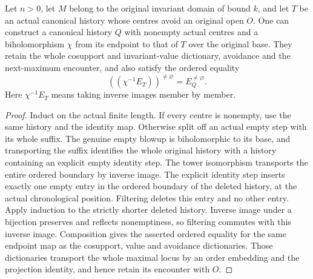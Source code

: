 \begin{theorem}
\label{hir:original-empty-compression-filtered-boundary}
\leanok
Let $n>0$, let $M$ belong to the original invariant domain of bound $k$,
and let $T$ be an actual canonical history whose centres avoid an
original open $O$.  One can construct a canonical history $Q$ with
nonempty actual centres and a biholomorphism $\chi$ from its endpoint to
that of $T$ over the original base.  They retain the whole cosupport and
invariant-value dictionary, avoidance and the next-maximum encounter,
and also satisfy the ordered equality
\[
 ((\chi^{-1}E_T))^{\ne\varnothing}=E_Q^{\ne\varnothing}.
\]
Here $\chi^{-1}E_T$ means taking inverse images member by member.
\end{theorem}
\begin{proof}
Induct on the actual finite length.  If every centre is nonempty, use
the same history and the identity map.  Otherwise split off an actual
empty step with its whole suffix.  The genuine empty blowup is
biholomorphic to its base, and transporting the suffix identifies the
whole original history with a history containing an explicit empty
identity step.  The tower isomorphism transports the entire ordered
boundary by inverse image.  The explicit identity step inserts exactly
one empty entry in the ordered boundary of the deleted history, at the
actual chronological position.  Filtering deletes this entry and no
other entry.  Apply induction to the strictly shorter deleted history.
Inverse image under a bijection preserves and reflects nonemptiness,
so filtering commutes with this inverse image.  Composition gives the
asserted ordered equality for the same endpoint map as the cosupport,
value and avoidance dictionaries.  Those dictionaries transport the
whole maximal locus by an order embedding and the projection identity,
and hence retain its encounter with $O$.
\end{proof}


